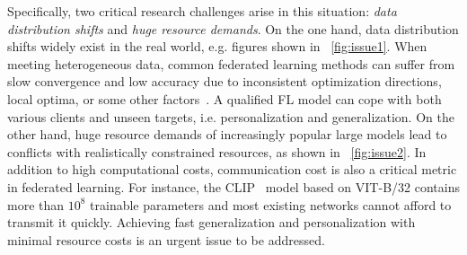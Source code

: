 \documentclass[11pt]{article}
\newcommand{\wjdd}[1]{\todo[linecolor=cyan,backgroundcolor=cyan!25,bordercolor=cyan,size=\scriptsize]{(WJD): #1}}
\begin{document}
Specifically, two critical research challenges arise in this situation: \emph{data distribution shifts} and \emph{huge resource demands}.
On the one hand, data distribution shifts widely exist in the real world, e.g. figures shown in \figurename~\ref{fig:issue1}.
When meeting heterogeneous data, common federated learning methods can suffer from slow convergence and low accuracy due to inconsistent optimization directions, local optima, or some other factors~\cite{gao2022feddc}.
A qualified FL model can cope with both various clients and unseen targets, i.e. personalization and generalization.
On the other hand, huge resource demands of increasingly popular large models lead to conflicts with realistically constrained resources, as shown in \figurename~\ref{fig:issue2}.
In addition to high computational costs, communication cost is also a critical metric in federated learning.
For instance, the CLIP~\cite{radford2021learning} model based on VIT-B/32 contains more than $10^8$ trainable parameters and most existing networks cannot afford to transmit it quickly.
Achieving fast generalization and personalization with minimal resource costs is an urgent issue to be addressed.

\end{document}
